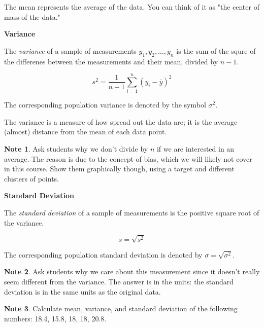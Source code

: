 \documentclass[11pt]{article}
\theoremstyle{definition}
\newtheorem{note}{Note}
\begin{document}
The mean represents the average of the data. You can think of it as "the center of mass of the data."

\begin{shaded}

	\textbf{Variance} \newline
	
	The \textit{variance} of a sample of measurements $y_1, y_2, \ldots, y_n$ is the sum of the squre of the differenes between the measurements and their mean, divided by $n-1$.
	
	$$
	s^2 = \frac{1}{n-1} \sum_{i=1}^n (y_i-\bar{y})^2
	$$
	
	The corresponding population variance is denoted by the symbol $\sigma^2$.

\end{shaded}

The variance is a measure of how spread out the data are; it is the average (almost) distance from the mean of each data point.

\begin{note}
	Ask students why we don't divide by $n$ if  we are interested in an average. The reason is due to the concept of bias, which we will likely not cover in this course. Show them graphically though, using a target and different clusters of points.
\end{note}

\begin{shaded}

	\textbf{Standard Deviation}
	
	The \textit{standard deviation} of a sample of measurements is the positive square root of the variance.
	
	$$
	s = \sqrt{s^2}
	$$
	
	The corresponding population standard deviation is denoted by $\sigma = \sqrt{\sigma^2}$.

\end{shaded}

\begin{note}
	Ask students why we care about this measurement since it doesn't really seem different from the variance. The answer is in the units: the standard deviation is in the same units as the original data.
\end{note}

\begin{note}
	Calculate mean, variance, and standard deviation of the following numbers: 18.4, 15.8, 18, 18, 20.8.
\end{note}
\end{document}
